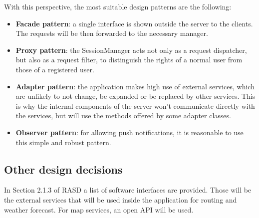 With this perspective, the most suitable design patterns are the following:

\begin{itemize}
	\item \textbf{Facade pattern}: a single interface is shown outside the server to the clients. The requests will be then forwarded to the necessary manager.
	\item \textbf{Proxy pattern}: the SessionManager acts not only as a request dispatcher, but also as a request filter, to distinguish the rights of a normal user from those of a registered user.
	\item \textbf{Adapter pattern}: the application makes high use of external services, which are unlikely to not change, be expanded or be replaced by other services. This is why the internal components of the server won’t communicate directly with the services, but will use the methods offered by some adapter classes.
	\item \textbf{Observer pattern}: for allowing push notifications, it is reasonable to use this simple and robust pattern.
\end{itemize}

\subsection{Other design decisions}

In Section 2.1.3 of RASD a list of software interfaces are provided. Those will be the external services that will be used inside the application for routing and weather forecast. For map services, an open API will be used.
